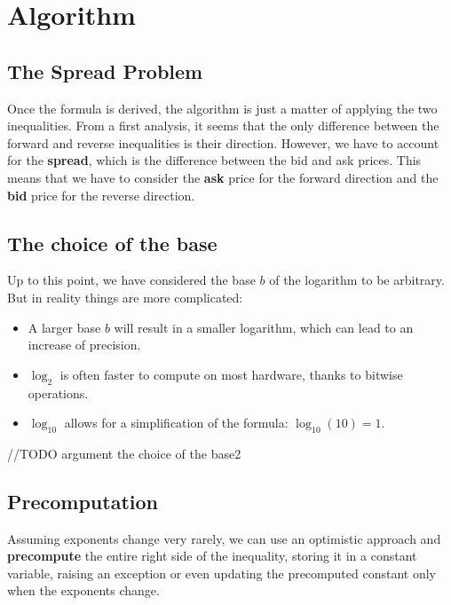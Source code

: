 \documentclass[11pt]{article}
\begin{document}
\section{Algorithm}

\subsection{The Spread Problem}
Once the formula is derived, the algorithm is just a matter of applying the two inequalities. From a first analysis, it seems that the only difference between the forward and reverse inequalities is their direction. However, we have to account for the \textbf{spread}, which is the difference between the bid and ask prices. This means that we have to consider the \textbf{ask} price for the forward direction and the \textbf{bid} price for the reverse direction.

\subsection{The choice of the base}
Up to this point, we have considered the base $b$ of the logarithm to be arbitrary.
But in reality things are more complicated:
\begin{itemize}
    \item A larger base $b$ will result in a smaller logarithm, which can lead to an increase of precision\textsuperscript{\cite{floating-point-precision}}.
    \item $\log_{2}$ is often faster to compute on most hardware, thanks to bitwise operations\textsuperscript{\cite{log2-advantage}}.
    \item $\log_{10}$ allows for a simplification of the formula: $\log_{10}(10) = 1$.
\end{itemize}

//TODO argument the choice of the base2

\subsection{Precomputation}
Assuming exponents change very rarely, we can use an optimistic approach and \textbf{precompute} the entire right side of the inequality, storing it in a constant variable, raising an exception or even updating the precomputed constant only when the exponents change.
\end{document}
